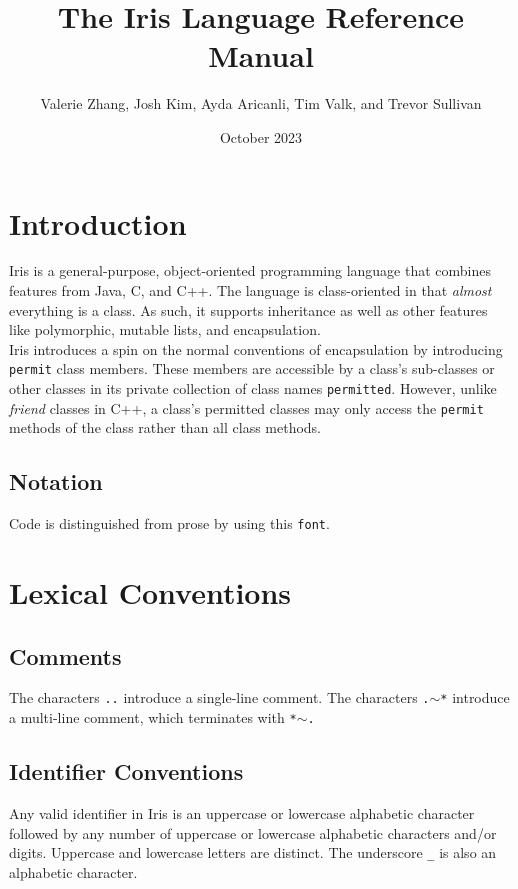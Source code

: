 \documentclass{article}
\begin{document}
\title{The Iris Language Reference Manual}
\author{Valerie Zhang, Josh Kim, Ayda Aricanli, Tim Valk, and Trevor Sullivan}
\date{October 2023}
\maketitle

\pagebreak
\tableofcontents 

\pagebreak

\section{Introduction}
Iris is a general-purpose, object-oriented programming language that combines features from Java, C, and C++. The language is class-oriented in that \textit{almost} everything is a class. As such, it supports inheritance as well as other features like polymorphic, mutable lists, and encapsulation. \\

\noindent Iris introduces a spin on the normal conventions of encapsulation by introducing \texttt{permit} class members. These members are accessible by a class's sub-classes or other classes in its private collection of class names \texttt{permitted}. However, unlike \textit{friend} classes in C++, a class's permitted classes may only access the \texttt{permit} methods of the class rather than all class methods. 
\subsection{Notation}
Code is distinguished from prose by using this \texttt{font}.
\section{Lexical Conventions}
\subsection{Comments}
The characters \texttt{..} introduce a single-line comment. \newline
The characters \texttt{.\(\sim\)*} introduce a multi-line comment, which terminates with \texttt{*\(\sim\).}

\subsection{Identifier Conventions}
\noindent Any valid identifier in Iris is an uppercase or lowercase alphabetic character followed by any number of uppercase or lowercase alphabetic characters and/or digits. Uppercase and lowercase letters are distinct. The underscore \texttt{\_} is also an alphabetic character.
\end{document}
